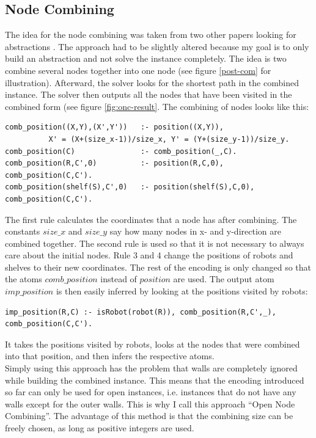 \documentclass[runningheads]{llncs}
\begin{document}
\subsection{Node Combining}
The idea for the node combining was taken from two other papers looking for abstractions \cite{nc1} \cite{nc2}. The approach had to be slightly altered because my goal is to only build an abstraction and not solve the instance completely. The idea is two combine several nodes together into one node (see figure \ref{post-com} for illustration). Afterward, the solver looks for the shortest path in the combined instance. The solver then outputs all the nodes that have been visited in the combined form (see figure \ref{fig:onc-result}. The combining of nodes looks like this:
\begin{verbatim}
comb_position((X,Y),(X',Y'))   :- position((X,Y)),
          X' = (X+(size_x-1))/size_x, Y' = (Y+(size_y-1))/size_y.
comb_position(C)               :- comb_position(_,C).
comb_position(R,C',0)          :- position(R,C,0), comb_position(C,C').
comb_position(shelf(S),C',0)   :- position(shelf(S),C,0), comb_position(C,C').
\end{verbatim}
The first rule calculates the coordinates that a node has after combining. The constants $size\_x$ and $size\_y$ say how many nodes in x- and y-direction are combined together. The second rule is used so that it is not necessary to always care about the initial nodes. Rule 3 and 4 change the positions of robots and shelves to their new coordinates. The rest of the encoding is only changed so that the atoms $comb\_position$ instead of $position$ are used. The output atom $imp\_position$ is then easily inferred by looking at the positions visited by robots:
\begin{verbatim}
imp_position(R,C) :- isRobot(robot(R)), comb_position(R,C',_), comb_position(C,C').
\end{verbatim}
It takes the positions visited by robots, looks at the nodes that were combined into that position, and then infers the respective atoms. \\
Simply using this approach has the problem that walls are completely ignored while building the combined instance. This means that the encoding introduced so far can only be used for open instances, i.e. instances that do not have any walls except for the outer walls. This is why I call this approach ``Open Node Combining''. The advantage of this method is that the combining size can be freely chosen, as long as positive integers are used. \\
\end{document}
